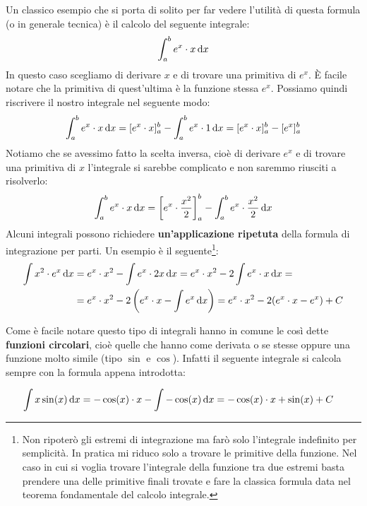 Un classico esempio che si porta di solito per far vedere l'utilità di questa formula (o in generale tecnica) è il calcolo del seguente integrale:
\begin{equation*}
	\int_a^b e^x \cdot x\,\text{d} x
\end{equation*}
In questo caso scegliamo di derivare $x$ e di trovare una primitiva di $e^x$. È facile notare che la primitiva di quest'ultima è la funzione stessa $e^x$. Possiamo quindi riscrivere il nostro integrale nel seguente modo:
\begin{equation*}
	\int_a^b e^x \cdot x \,\text{d} x = [e^x \cdot x]_a^b - \int_a^b e^x \cdot 1 \,\text{d} x = [e^x \cdot x]_a^b - [e^x]_a^b
\end{equation*}
Notiamo che se avessimo fatto la scelta inversa, cioè di derivare $e^x$ e di trovare una primitiva di $x$ l'integrale si sarebbe complicato e non saremmo riusciti a risolverlo:
\begin{equation*}
	\int_a^b e^x \cdot x\,\text{d} x = \left[e^x \cdot \dfrac{x^2}{2}\right]_a^b - \int_a^b e^x \cdot \dfrac{x^2}{2} \,\text{d} x
\end{equation*}
Alcuni integrali possono richiedere \textbf{un'applicazione ripetuta} della formula di integrazione per parti. Un esempio è il seguente\footnote{Non ripoterò gli estremi di integrazione ma farò solo l'integrale indefinito per semplicità. In pratica mi riduco solo a trovare le primitive della funzione. Nel caso in cui si voglia trovare l'integrale della funzione tra due estremi basta prendere una delle primitive finali trovate e fare la classica formula data nel teorema fondamentale del calcolo integrale.}:
\begin{align*}
	\int x^2 \cdot e^x \,\text{d} x &= e^x \cdot x^2 - \int e^x \cdot 2 x \,\text{d} x = e^x \cdot x^2 - 2 \int e^x \cdot x \,\text{d} x = \\
	&= e^x \cdot x^2 - 2 \left(e^x \cdot x - \int e^x \,\text{d} x \right) = e^x \cdot x^2 - 2 (e^x \cdot x - e^x) + C
\end{align*}

Come è facile notare questo tipo di integrali hanno in comune le così dette \textbf{funzioni circolari}, cioè quelle che hanno come derivata o se stesse oppure una funzione molto simile (tipo $\sin$ e $\cos$). Infatti il seguente integrale si calcola sempre con la formula appena introdotta:

\begin{align*}
	\int x \sin(x) \,\text{d} x &= -\cos(x) \cdot x - \int -\cos(x) \,\text{d} x = -\cos(x) \cdot x + \sin(x) + C
\end{align*}

